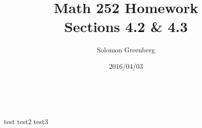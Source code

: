 \documentclass[12pt]{article}
\title{Math 252 Homework\\
\large Sections 4.2 \& 4.3}
\date{2016/04/03}
\author{Solomon Greenberg}
\begin{document}
    \newpage
    
    \paragraph*{\\}
        test
        test2
        test3
\thispagestyle{fancy}
\end{document}
